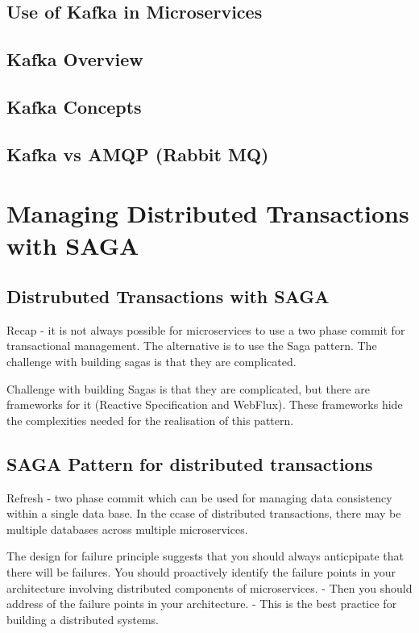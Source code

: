 \section{Use of Kafka in Microservices}

\section{Kafka Overview}
\section{Kafka Concepts}
\section{Kafka vs AMQP (Rabbit MQ)}

\chapter{Managing Distributed Transactions with SAGA}
\section{Distrubuted Transactions with SAGA}
Recap - it is not always possible for microservices to use a two phase commit for transactional management.
The alternative is to use the Saga pattern.
The challenge with building sagas is that they are complicated.

Challenge with building Sagas is that they are complicated, but there are frameworks for it (Reactive Specification and WebFlux).
These frameworks hide the complexities needed for the realisation of this pattern.

\section{SAGA Pattern for distributed transactions}
Refresh - two phase commit which can be used for managing data consistency within a single data base.
In the ccase of distributed transactions, there may be multiple databases across multiple microservices.

The design for failure principle suggests that you should always anticpipate that there will be failures.
You should proactively identify the failure points in your architecture involving distributed components of microservices.
- Then you should address of the failure points in your architecture.
- This is the best practice for building a distributed systems.


